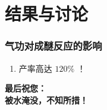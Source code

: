 \documentclass[xcolor=dvipsnames]{beamer}
\begin{document}
\section{结果与讨论}

\begin{frame}
  \frametitle{气功对成醚反应的影响}


  \begin{enumerate}
    \item 产率高达 $ 120\% $ ！
  \end{enumerate}

\end{frame}

\begin{frame}[c, plain]
  \begin{center}
    \Huge{\textbf{最后祝您：}}\\
    \Huge{\textbf{被水淹没，不知所措！}}
  \end{center}
\end{frame}
\end{document}
